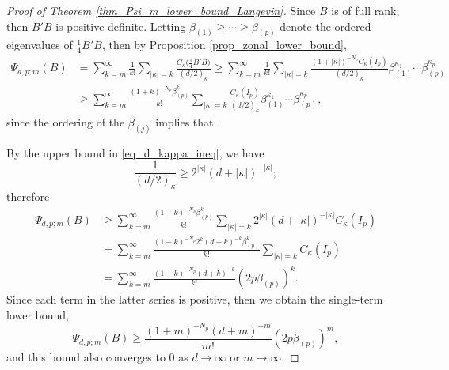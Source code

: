 \documentclass[pdftex]{sigma}
\numberwithin{equation}{section}
\begin{document}
\begin{proof}[Proof of Theorem \ref{thm_Psi_m_lower_bound_Langevin}]
Since $B$ is of full rank, then $B'B$ is positive definite. Letting $\beta_{(1)} \ge \cdots \ge \beta_{(p)}$ denote the ordered eigenvalues of $\tfrac14 B'B$, then by Proposition \ref{prop_zonal_lower_bound},
\begin{align*}
\Psi_{d,p;m}(B) &= \sum_{k=m}^\infty \frac{1}{k!} \sum_{|\kappa|=k} \frac{C_\kappa\bigl(\frac14 B'B\bigr)}{(d/2)_\kappa} \ge \sum_{k=m}^\infty \frac{1}{k!} \sum_{|\kappa|=k} \frac{(1+|\kappa|)^{-N_p} C_\kappa(I_p)}{(d/2)_\kappa} \beta_{(1)}^{\kappa_1} \cdots \beta_{(p)}^{\kappa_p} \\
&\ge \sum_{k=m}^\infty \frac{(1+k)^{-N_p} \beta_{(p)}^k}{k!} \sum_{|\kappa|=k} \frac{C_\kappa(I_p)}{(d/2)_\kappa} \beta_{(1)}^{\kappa_1} \cdots \beta_{(p)}^{\kappa_p},
\end{align*}
since the ordering of the $\beta_{(j)}$ implies that .

By the upper bound in \eqref{eq_d_kappa_ineq}, we have
\[
\frac{1}{(d/2)_\kappa} \ge 2^{|\kappa|} (d+|\kappa|)^{-|\kappa|};
\]
therefore
\begin{align*}
\Psi_{d,p;m}(B) &\ge \sum_{k=m}^\infty \frac{(1+k)^{-N_p} \beta_{(p)}^k}{k!} \sum_{|\kappa|=k} 2^{|\kappa|} (d+|\kappa|)^{-|\kappa|} C_\kappa(I_p) \\
&= \sum_{k=m}^\infty \frac{(1+k)^{-N_p} 2^k (d+k)^{-k} \beta_{(p)}^k}{k!} \sum_{|\kappa|=k} C_\kappa(I_p) \\
&= \sum_{k=m}^\infty \frac{(1+k)^{-N_p} (d+k)^{-k}}{k!} (2p\beta_{(p)})^k.
\end{align*}
Since each term in the latter series is positive, then we obtain the single-term lower bound,
\[
\Psi_{d,p;m}(B) \ge \frac{(1+m)^{-N_p} (d+m)^{-m}}{m!} (2p\beta_{(p)})^m,
\]
and this bound also converges to $0$ as $d \to \infty$ or $m \to \infty$.


\end{proof}
\end{document}
